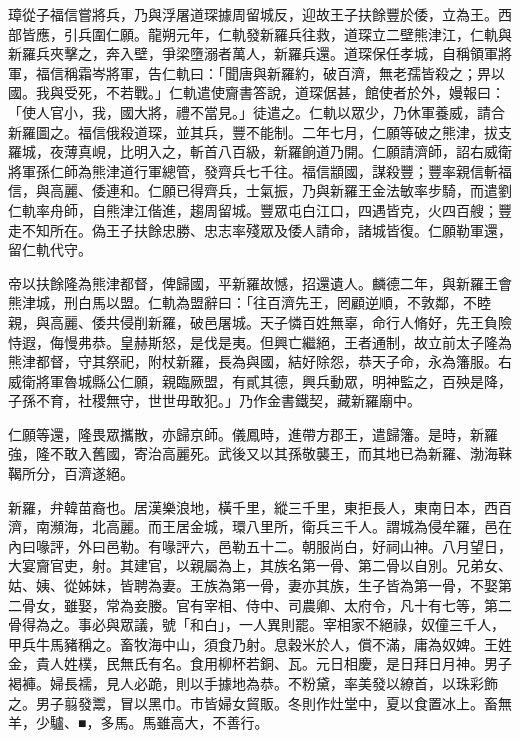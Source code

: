 \begin{pinyinscope}
 璋從子福信嘗將兵，乃與浮屠道琛據周留城反，迎故王子扶餘豐於倭，立為王。西部皆應，引兵圍仁願。龍朔元年，仁軌發新羅兵往救，道琛立二壁熊津江，仁軌與新羅兵夾擊之，奔入壁，爭梁墮溺者萬人，新羅兵還。道琛保任孝城，自稱領軍將軍，福信稱霜岑將軍，告仁軌曰：「聞唐與新羅約，破百濟，無老孺皆殺之；畀以國。我與受死，不若戰。」仁軌遣使齎書答說，道琛倨甚，館使者於外，嫚報曰：「使人官小，我，國大將，禮不當見。」徒遣之。仁軌以眾少，乃休軍養威，請合新羅圖之。福信俄殺道琛，並其兵，豐不能制。二年七月，仁願等破之熊津，拔支羅城，夜薄真峴，比明入之，斬首八百級，新羅餉道乃開。仁願請濟師，詔右威衛將軍孫仁師為熊津道行軍總管，發齊兵七千往。福信顓國，謀殺豐；豐率親信斬福信，與高麗、倭連和。仁願已得齊兵，士氣振，乃與新羅王金法敏率步騎，而遣劉仁軌率舟師，自熊津江偕進，趨周留城。豐眾屯白江口，四遇皆克，火四百艘；豐走不知所在。偽王子扶餘忠勝、忠志率殘眾及倭人請命，諸城皆復。仁願勒軍還，留仁軌代守。



 帝以扶餘隆為熊津都督，俾歸國，平新羅故憾，招還遺人。麟德二年，與新羅王會熊津城，刑白馬以盟。仁軌為盟辭曰：「往百濟先王，罔顧逆順，不敦鄰，不睦親，與高麗、倭共侵削新羅，破邑屠城。天子憐百姓無辜，命行人脩好，先王負險恃遐，侮慢弗恭。皇赫斯怒，是伐是夷。但興亡繼絕，王者通制，故立前太子隆為熊津都督，守其祭祀，附杖新羅，長為與國，結好除怨，恭天子命，永為籓服。右威衛將軍魯城縣公仁願，親臨厥盟，有貳其德，興兵動眾，明神監之，百殃是降，子孫不育，社稷無守，世世毋敢犯。」乃作金書鐵契，藏新羅廟中。



 仁願等還，隆畏眾攜散，亦歸京師。儀鳳時，進帶方郡王，遣歸籓。是時，新羅強，隆不敢入舊國，寄治高麗死。武後又以其孫敬襲王，而其地已為新羅、渤海靺鞨所分，百濟遂絕。



 新羅，弁韓苗裔也。居漢樂浪地，橫千里，縱三千里，東拒長人，東南日本，西百濟，南瀕海，北高麗。而王居金城，環八里所，衛兵三千人。謂城為侵牟羅，邑在內曰喙評，外曰邑勒。有喙評六，邑勒五十二。朝服尚白，好祠山神。八月望日，大宴齎官吏，射。其建官，以親屬為上，其族名第一骨、第二骨以自別。兄弟女、姑、姨、從姊妹，皆聘為妻。王族為第一骨，妻亦其族，生子皆為第一骨，不娶第二骨女，雖娶，常為妾媵。官有宰相、侍中、司農卿、太府令，凡十有七等，第二骨得為之。事必與眾議，號「和白」，一人異則罷。宰相家不絕祿，奴僮三千人，甲兵牛馬豬稱之。畜牧海中山，須食乃射。息穀米於人，償不滿，庸為奴婢。王姓金，貴人姓樸，民無氏有名。食用柳杯若銅、瓦。元日相慶，是日拜日月神。男子褐褲。婦長襦，見人必跪，則以手據地為恭。不粉黛，率美發以繚首，以珠彩飾之。男子翦發鬻，冒以黑巾。市皆婦女貿販。冬則作灶堂中，夏以食置冰上。畜無羊，少驢、■，多馬。馬雖高大，不善行。




\end{pinyinscope}
